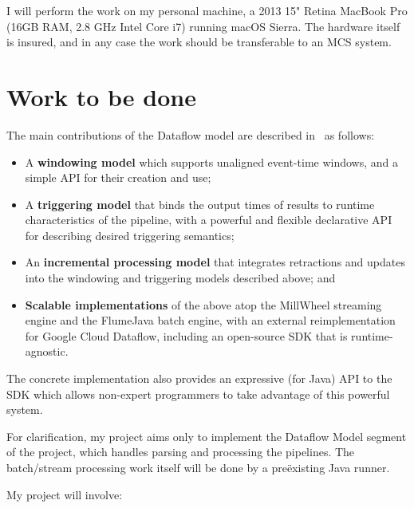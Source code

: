 I will perform the work on my personal machine, a 2013 15" Retina MacBook Pro (16GB RAM, 2.8 GHz Intel Core i7) running macOS Sierra. The hardware itself is insured, and in any case the work should be transferable to an MCS system.

\section*{Work to be done}

The main contributions of the Dataflow model are described in~\cite{Akidau:2015} as follows:

\begin{itemize}
	\item A \textbf{windowing model} which supports unaligned event-time windows, and a simple API for their creation and use;
	\item A \textbf{triggering model} that binds the output times of results to runtime characteristics of the pipeline, with a powerful and flexible declarative API for describing desired triggering semantics;
	\item An \textbf{incremental processing model} that integrates retractions and updates into the windowing and triggering models described above; and
	\item \textbf{Scalable implementations} of the above atop the MillWheel streaming engine and the FlumeJava batch engine, with an external reimplementation for Google Cloud Dataflow, including an open-source SDK that is runtime-agnostic.
\end{itemize}

The concrete implementation also provides an expressive (for Java) API to the SDK which allows non-expert programmers to take advantage of this powerful system.

For clarification, my project aims only to implement the Dataflow Model segment of the project, which handles parsing and processing the pipelines. The batch/stream processing work itself will be done by a pre\"existing Java runner.

My project will involve:

